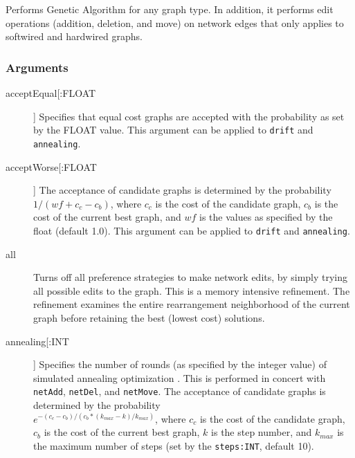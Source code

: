 	\begin{phygdescription}
		{Performs Genetic Algorithm \citep{Holland1975} for any graph type. In addition, 
		it performs edit operations (addition, deletion, and move) on network edges that 
		only applies to softwired and hardwired graphs.}
	\end{phygdescription}

	\subsubsection{Arguments}
		
	\begin{description}
	
		\item[acceptEqual[:FLOAT]] Specifies that equal cost graphs are accepted with the
		probability as set by the FLOAT value. This argument can be applied to \texttt{drift}
		and \texttt{annealing}.
			
		\item[acceptWorse[:FLOAT]] The acceptance of candidate graphs is determined by the 
		probability $1/ (wf + c_c - c_b)$, where $c_c$ is the cost of the candidate graph, $c_b$ 
		is the cost of the current best graph, and $wf$ is the values as specified by the float 
		(default 1.0). This argument can be applied to \texttt{drift} 	and \texttt{annealing}.
	
		\item[all] Turns off all preference strategies to make network edits, by simply trying 
		all possible edits to the graph. This is a memory intensive refinement.
		The refinement examines the entire rearrangement neighborhood of the current graph 
		before retaining the best (lowest cost) solutions.

		\item[annealing[:INT]] Specifies the number of rounds (as specified by the integer 
		value) of simulated annealing optimization \citep{Metropolisetal1953, 
		Kirkpatricketal1983, Cerny1985}. This is performed in concert with \texttt{netAdd}, 
		\texttt{netDel}, and \texttt{netMove}. The acceptance of candidate graphs is 
		determined by the probability\\ $e ^ {- (c_c - c_b)/ (c_b * (k_{max} -k)/ k_{max})}$, 
		where $c_c$ is the cost of the candidate graph, $c_b$ is the cost of the current 
		best graph, $k$ is the step number, and $k_{max}$ is the maximum number of 
		steps (set by the \texttt{steps:INT}, default 10).

		\begin{description}
			

\end{description}
\end{description}
